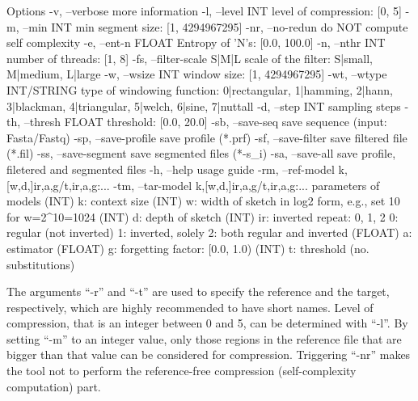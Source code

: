 \begin{code}[style=bash]
  Options                                                      
  -v,  --verbose             more information                  
  -l,  --level INT           level of compression: [0, 5]      
  -m,  --min   INT           min segment size: [1, 4294967295] 
  -nr, --no-redun            do NOT compute self complexity    
  -e,  --ent-n FLOAT         Entropy of 'N's: [0.0, 100.0]     
  -n,  --nthr  INT           number of threads: [1, 8]         
  -fs, --filter-scale S|M|L  scale of the filter:              
                             {S|small, M|medium, L|large}      
  -w,  --wsize INT           window size: [1, 4294967295]      
  -wt, --wtype INT/STRING    type of windowing function:       
                             {0|rectangular, 1|hamming, 2|hann,
                             3|blackman, 4|triangular, 5|welch,
                             6|sine, 7|nuttall}                
  -d,  --step   INT          sampling steps                    
  -th, --thresh FLOAT        threshold: [0.0, 20.0]        
  -sb, --save-seq            save sequence (input: Fasta/Fastq)
  -sp, --save-profile        save profile (*.prf)              
  -sf, --save-filter         save filtered file (*.fil)
  -ss, --save-segment        save segmented files (*-s_i)      
  -sa, --save-all            save profile, filetered and       
                             segmented files                   
  -h,  --help                usage guide                       
  -rm, --ref-model  k,[w,d,]ir,a,g/t,ir,a,g:...                
  -tm, --tar-model  k,[w,d,]ir,a,g/t,ir,a,g:...                
                             parameters of models              
                       (INT) k:  context size                  
                       (INT) w:  width of sketch in log2 form, 
                                 e.g., set 10 for w=2^10=1024  
                       (INT) d:  depth of sketch               
                       (INT) ir: inverted repeat: {0, 1, 2}    
                                 0: regular (not inverted)     
                                 1: inverted, solely           
                                 2: both regular and inverted  
                     (FLOAT) a:  estimator                     
                     (FLOAT) g:  forgetting factor: [0.0, 1.0) 
                       (INT) t:  threshold (no. substitutions)
\end{code}

The arguments ``-r'' and ``-t'' are used to specify the reference and the target, respectively, which are highly recommended to have short names. Level of compression, that is an integer between 0 and 5, can be determined with ``-l''. By setting ``-m'' to an integer value, only those regions in the reference file that are bigger than that value can be considered for compression. Triggering ``-nr'' makes the tool not to perform the reference-free compression (self-complexity computation) part. 

